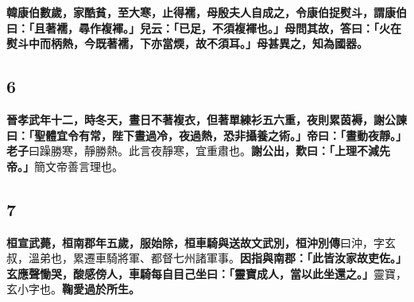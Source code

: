 \textbf{韓康伯數歲，家酷貧，至大寒，止得襦，母殷夫人自成之，令康伯捉熨斗，謂康伯曰：「且著襦，尋作複褌。」兒云：「已足，不須複褌也。」母問其故，答曰：「火在熨斗中而柄熱，今既著襦，下亦當煗，故不須耳。」母甚異之，知為國器。}

\subsection*{6}

\textbf{晉孝武年十二，時冬天，晝日不著複衣，但著單練衫五六重，夜則累茵褥，謝公諫曰：「聖體宜令有常，陛下晝過冷，夜過熱，恐非攝養之術。」帝曰：「晝動夜靜。」}{\footnotesize \textbf{老子}曰躁勝寒，靜勝熱。此言夜靜寒，宜重肅也。}\textbf{謝公出，歎曰：「上理不減先帝。」}{\footnotesize 簡文帝善言理也。}

\subsection*{7}

\textbf{桓宣武薨，桓南郡年五歲，服始除，桓車騎與送故文武別，}{\footnotesize \textbf{桓沖別傳}曰沖，字玄叔，溫弟也，累遷車騎將軍、都督七州諸軍事。}\textbf{因指與南郡：「此皆汝家故吏佐。」玄應聲慟哭，酸感傍人，車騎每自目己坐曰：「靈寶成人，當以此坐還之。」}{\footnotesize 靈寶，玄小字也。}\textbf{鞠愛過於所生。}